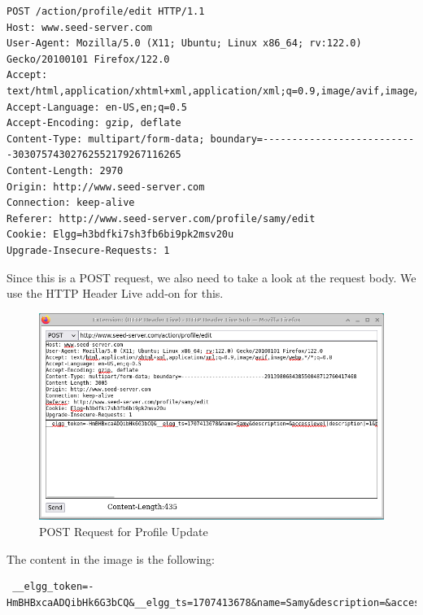 \documentclass[12pt]{article}
\begin{document}
\begin{verbatim}
POST /action/profile/edit HTTP/1.1
Host: www.seed-server.com
User-Agent: Mozilla/5.0 (X11; Ubuntu; Linux x86_64; rv:122.0) Gecko/20100101 Firefox/122.0
Accept: text/html,application/xhtml+xml,application/xml;q=0.9,image/avif,image/webp,*/*;q=0.8
Accept-Language: en-US,en;q=0.5
Accept-Encoding: gzip, deflate
Content-Type: multipart/form-data; boundary=---------------------------30307574302762552179267116265
Content-Length: 2970
Origin: http://www.seed-server.com
Connection: keep-alive
Referer: http://www.seed-server.com/profile/samy/edit
Cookie: Elgg=h3bdfki7sh3fb6bi9pk2msv20u
Upgrade-Insecure-Requests: 1
\end{verbatim}

Since this is a POST request, we also need to take a look at the request body. We use the HTTP Header Live add-on for this.

     \begin{figure}[H]
         \centering
         \includegraphics[width=\textwidth]{Images/ss2.png}
         \caption{POST Request for Profile Update}
         \label{fig:ss2}
     \end{figure}

The content in the image is the following:

\begin{verbatim}
 __elgg_token=-HmBHBxcaADQibHk6G3bCQ&__elgg_ts=1707413678&name=Samy&description=&accesslevel[description]=1&briefdescription=1905001&accesslevel[briefdescription]=1&location=&accesslevel[location]=1&interests=&accesslevel[interests]=1&skills=&accesslevel[skills]=1&contactemail=&accesslevel[contactemail]=1&phone=&accesslevel[phone]=1&mobile=&accesslevel[mobile]=1&website=&accesslevel[website]=1&twitter=&accesslevel[twitter]=1&guid=59
\end{verbatim}
\end{document}
